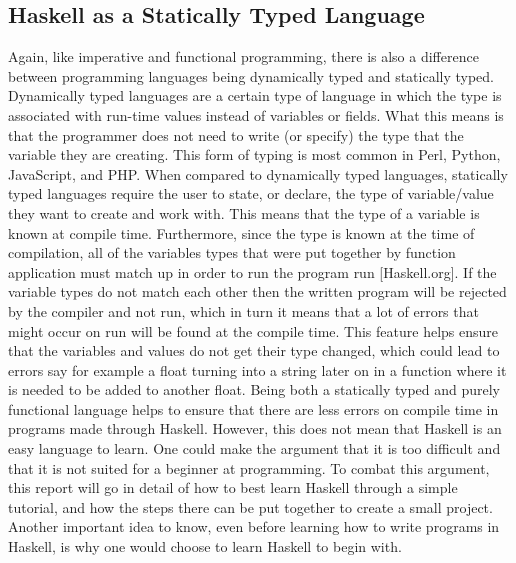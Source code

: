 \documentclass{article}
\begin{document}
\medskip\noindent
\subsection{Haskell as a Statically Typed Language}
Again, like imperative and functional programming, there is also a difference between programming languages being dynamically typed and statically typed.
Dynamically typed languages are a certain type of language in which the type is associated with run-time values instead of variables or fields.
What this means is that the programmer does not need to write (or specify) the type that the variable they are creating.
This form of typing is most common in Perl, Python, JavaScript, and PHP.
When compared to dynamically typed languages, statically typed languages require the user to state, or declare, the type of variable/value they want to create and work with.
This means that the type of a variable is known at compile time.
Furthermore, since the type is known at the time of compilation, all of the variables types that were put together by function application must match up in order to run the program run \cite{2} [Haskell.org].
If the variable types do not match each other then the written program will be rejected by the compiler and not run, which in turn it means that a lot of errors that might occur on run will be found at the compile time.
This feature helps ensure that the variables and values do not get their type changed, which could lead to errors say for example a float turning into a string later on in a function where it is needed to be added to another float.
Being both a statically typed and purely functional language helps to ensure that there are less errors on compile time in programs made through Haskell.
However, this does not mean that Haskell is an easy language to learn.
One could make the argument that it is too difficult and that it is not suited for a beginner at programming.
To combat this argument, this report will go in detail of how to best learn Haskell through a simple tutorial, and how the steps there can be put together to create a small project.
Another important idea to know, even before learning how to write programs in Haskell, is why one would choose to learn Haskell to begin with.

\medskip\noindent
\end{document}
